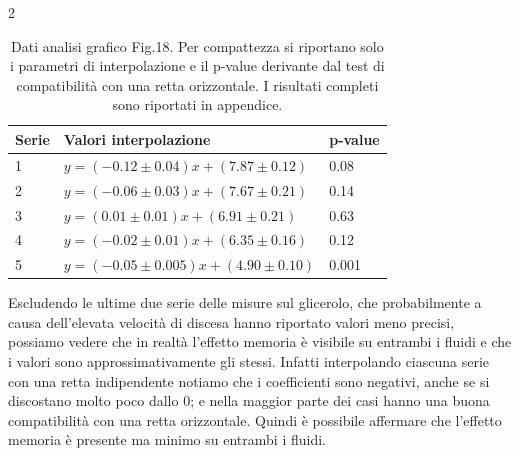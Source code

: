 \documentclass{article}
\begin{document}
\begin{multicols}{2}
\begin{table}[H]
\begin{tabular}{|p{1cm}|p{4.5cm}|p{1cm}|}
\hline
\small
\textbf{Serie} & \textbf{Valori interpolazione} & \textbf{p-value} \\ \hline
1 & $y = (-0.12 \pm 0.04)x + (7.87 \pm 0.12)$ & 0.08 \\ \hline
2 & $y = (-0.06 \pm 0.03)x + (7.67 \pm 0.21)$ & 0.14 \\ \hline
3 & $y = (0.01 \pm 0.01)x + (6.91 \pm 0.21)$ & 0.63\\ \hline
4 & $y = (-0.02\pm 0.01)x + (6.35 \pm 0.16)$ & 0.12\\ \hline
5 & $y = (-0.05 \pm 0.005)x + (4.90 \pm 0.10)$ & 0.001 \\ \hline
\end{tabular}
\caption{Dati analisi grafico Fig.18. Per compattezza si riportano solo i parametri di interpolazione e il p-value derivante dal test di compatibilità con una retta orizzontale. I risultati completi sono riportati in appendice.}
\end{table}
 Escludendo le ultime due serie delle misure sul glicerolo, che probabilmente a causa dell'elevata velocità di discesa hanno riportato valori meno precisi, possiamo vedere che in realtà l'effetto memoria è visibile su entrambi i fluidi e che i valori sono approssimativamente gli stessi. Infatti interpolando ciascuna serie con una retta indipendente notiamo che i coefficienti sono negativi, anche se si discostano molto poco dallo 0; e nella maggior parte dei casi hanno una buona compatibilità con una retta orizzontale. Quindi è possibile affermare che l'effetto memoria è presente ma minimo su entrambi i fluidi.   


\end{multicols}
\end{document}

